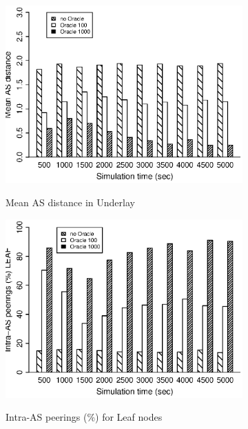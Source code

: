 \begin{figure}[tbp]
	\begin{subfigure}[]{0.32\linewidth}
     {\includegraphics[width=1\textwidth]{figures/asdist.eps}}
    \caption{Mean AS distance in Underlay\label{fig:oracle:gnutella_metric:2a}}
    \end{subfigure}
 \hfill
    \begin{subfigure}[]{0.32\linewidth}
    {\includegraphics[width=1\textwidth]{figures/intraAS-leaf.eps}}
    \caption{Intra-AS peerings (\%) for Leaf nodes\label{fig:oracle:gnutella_metric:2b}}
    \end{subfigure}
 \hfill
    \begin{subfigure}[]{0.32\linewidth}

\end{subfigure}
\end{figure}

